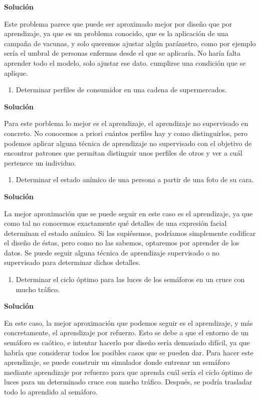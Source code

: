 \documentclass[11pt,a4paper]{article}
\newcommand{\answer}{\noindent\textbf{Solución}}
\begin{document}
\answer

Este problema parece que puede ser aproximado mejor por diseño que por aprendizaje, ya que es un problema conocido, que 
es la aplicación de una campaña de vacunas, y solo queremos ajustar algún parámetro, como por ejemplo sería el umbral de
personas enfermas desde el que se aplicaría. No haría falta aprender todo el modelo, solo ajustar ese dato.
cumplirse una condición que se aplique.

\begin{enumerate}[resume,label=\textit{\alph*})]
	\item Determinar perfiles de consumidor en una cadena de supermercados.
\end{enumerate}

\answer

Para este porblema lo mejor es el aprendizaje, el aprendizaje no supervisado en concreto. No conocemos a priori cuántos
perfiles hay y como distinguirlos, pero podemos aplicar alguna técnica de aprendizaje no supervisado con el objetivo de
encontrar patrones que permitan distinguir unos perfiles de otros y ver a cuál pertenece un individuo. 

\begin{enumerate}[resume,label=\textit{\alph*})]
	\item Determinar el estado anímico de una persona a partir de una foto de su cara.
\end{enumerate}

\answer

La mejor aproximación que se puede seguir en este caso es el aprendizaje, ya que como tal no conocemos exactamente
qué detalles de una expresión facial determinan el estado anímico. Si las supiésemos, podríamos simplemente codificar el
diseño de éstas, pero como no las sabemos, optaremos por aprender de los datos. Se puede seguir alguna técnica de aprendizaje
supervisado o no supervisado para determinar dichos detalles.

\begin{enumerate}[resume,label=\textit{\alph*})]
	\item Determinar el ciclo óptimo para las luces de los semáforos en un cruce con mucho tráfico.
\end{enumerate}

\answer

En este caso, la mejor aproximación que podemos seguir es el aprendizaje, y más concretamente, el aprendizaje por refuerzo.
Esto se debe a que el entorno de un semáforo es caótico, e intentar hacerlo por diseño sería demasiado difícil, ya
que habría que considerar todos los posibles casos que se pueden dar. Para hacer este aprendizaje, se puede construir un
simulador donde entrenar un semáforo mediante aprendizaje por refuerzo para que aprenda cuál sería el ciclo óptimo de luces
para un determinado cruce con mucho tráfico. Después, se podría trasladar todo lo aprendido al semáforo. 
\end{document}
